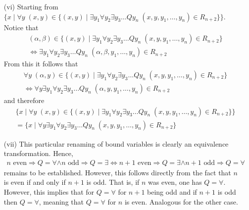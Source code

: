 \documentclass [11pt]{article}
\newcommand{\sto}{\Rightarrow}
\begin{document}
\begin{enumerate}
\item[(vi)] Starting from $\{x \mid \forall y \; (x,y) \in  \{(x,y) \mid \exists y_1 \forall y_2\exists y_3\dots Q y_n  \; (x,y,y_1,\ldots,y_n) \in R_{n+2}\}\}$. Notice that 
\begin{equation*}
\begin{split}
 &(\alpha, \beta) \in \{(x,y) \mid  \exists y_1 \forall y_2\exists y_3\dots Q y_n   \; (x,y,y_1,\ldots,y_n) \in R_{n+2}\} \\ 
 &\iff  \exists y_1 \forall y_2\exists y_3\dots Q y_n  \; (\alpha, \beta,y_1,\ldots,y_n) \in R_{n+2}
\end{split}
\end{equation*}
From this it follows that 
\begin{equation*}
\begin{split}
 &\forall y \; (\alpha,y) \in  \{(x,y) \mid  \exists y_1 \forall y_2\exists y_3\dots Q y_n   \; (x,y,y_1,\ldots,y_n) \in R_{n+2}\} \\ 
 &\iff \forall y  \exists y_1 \forall y_2\exists y_3\dots Q y_n  \; (\alpha, y,y_1,\ldots,y_n) \in R_{n+2}
\end{split}
\end{equation*}
and therefore
\begin{equation*}
\begin{split}
 &\{x \mid \forall y \; (x,y) \in  \{(x,y) \mid \exists y_1 \forall y_2\exists y_3\dots Q y_n  \; (x,y,y_1,\ldots,y_n) \in R_{n+2}\}\}\\ 
 &= \{x \mid \forall y  \exists y_1 \forall y_2\exists y_3\dots Q y_n   \; (x,y,y_1,\ldots,y_n) \in R_{n+2}\}
\end{split}
\end{equation*}


\item[(vii)] This particular renaming of bound variables is clearly an equivalence transformation. Hence, 
\begin{equation*}
\begin{split}
n \text{ even}  \sto Q=\forall \land n \text{ odd}  \sto Q=\exists  \iff  n+1 \text{ even}  \sto Q=\exists \land n+1 \text{ odd}  \sto Q=\forall 
\end{split}
\end{equation*}
remains to be established. However, this follows directly from the fact that $n$ is even if and only if $n+1$ is odd. That is, 
if $n$ was even, one has $Q=\forall$. However, this implies that for $Q=\forall$ for $n+1$ being odd and if $n+1$ is odd then $Q=\forall$, meaning that $Q=\forall$ for $n$ is even.
Analogous for the other case.
\end{enumerate}
\end{document}
